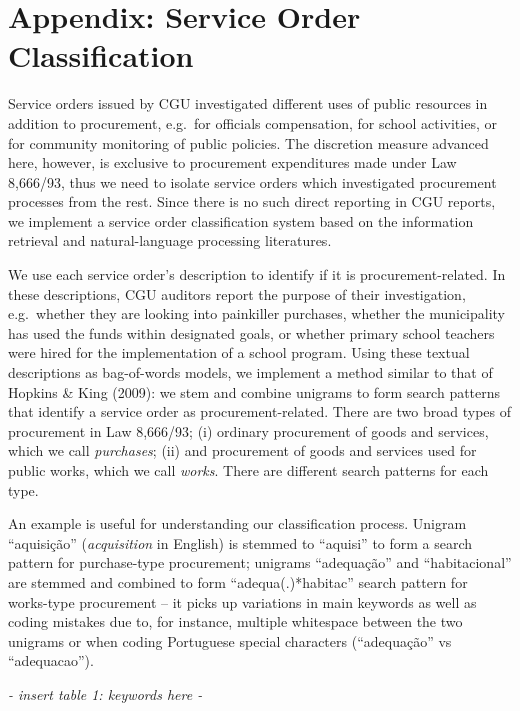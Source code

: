 \documentclass[]{article}
\title{}
\author{}
\date{}
\theoremstyle{definition}
\theoremstyle{definition}
\theoremstyle{definition}
\theoremstyle{remark}
\begin{document}
\hypertarget{appendix-appendix}{%
\appendix}


\hypertarget{appendixA}{%
\section{Appendix: Service Order Classification}\label{appendixA}}

Service orders issued by CGU investigated different uses of public
resources in addition to procurement, e.g.~for officials compensation,
for school activities, or for community monitoring of public policies.
The discretion measure advanced here, however, is exclusive to
procurement expenditures made under Law 8,666/93, thus we need to
isolate service orders which investigated procurement processes from the
rest. Since there is no such direct reporting in CGU reports, we
implement a service order classification system based on the information
retrieval and natural-language processing literatures.

We use each service order's description to identify if it is
procurement-related. In these descriptions, CGU auditors report the
purpose of their investigation, e.g.~whether they are looking into
painkiller purchases, whether the municipality has used the funds within
designated goals, or whether primary school teachers were hired for the
implementation of a school program. Using these textual descriptions as
bag-of-words models, we implement a method similar to that of Hopkins \&
King (2009): we stem and combine unigrams to form search patterns that
identify a service order as procurement-related. There are two broad
types of procurement in Law 8,666/93; (i) ordinary procurement of goods
and services, which we call \emph{purchases}; (ii) and procurement of
goods and services used for public works, which we call \emph{works}.
There are different search patterns for each type.

An example is useful for understanding our classification process.
Unigram ``aquisição'' (\emph{acquisition} in English) is stemmed to
``aquisi'' to form a search pattern for purchase-type procurement;
unigrams ``adequação'' and ``habitacional'' are stemmed and combined to
form ``adequa(.)*habitac'' search pattern for works-type procurement --
it picks up variations in main keywords as well as coding mistakes due
to, for instance, multiple whitespace between the two unigrams or when
coding Portuguese special characters (``adequação'' vs ``adequacao'').

\emph{- insert table 1: keywords here -}
\end{document}
